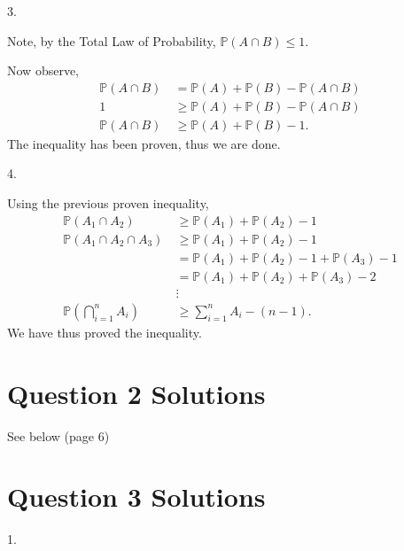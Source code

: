 \documentclass{article}
\begin{document}
3.

Note, by the Total Law of Probability, $\mathbb{P}(A\cap B) \leq 1$.

Now observe,
\begin{align*}
    \mathbb{P}(A\cap B) & = \mathbb{P}(A) +\mathbb{P}(B) - \mathbb{P}(A\cap B)\\    
    1 &\geq \mathbb{P}(A) +\mathbb{P}(B) - \mathbb{P}(A\cap B)\\
    \mathbb{P}(A\cap B)\ &\geq \mathbb{P}(A) +\mathbb{P}(B) - 1\mbox{.}
\end{align*}
\hspace*{6mm} The inequality has been proven, thus we are done.

4.

Using the previous proven inequality,
\begin{align*}
    \mathbb{P}(A_1\cap A_2)\ &\geq \mathbb{P}(A_1) + \mathbb{P}(A_2) - 1\\
    \mathbb{P}(A_1\cap A_2\cap A_3)\ &\geq \mathbb{P}(A_1) + \mathbb{P}(A_2) - 1\\
    &= \mathbb{P}(A_1) +\mathbb{P}(A_2) - 1 +  \mathbb{P}(A_3) - 1\\
    &= \mathbb{P}(A_1) +\mathbb{P}(A_2) +  \mathbb{P}(A_3) - 2\\
    &\vdots\\
    \mathbb{P}(\bigcap_{i = 1}^n A_i)\ &\geq \sum_{i = 1}^{n} A_i - (n-1)\mbox{.}
\end{align*}
\hspace*{6mm} We have thus proved the inequality. 

\section*{Question 2 Solutions} %
See below (page 6)
\pagebreak
\section*{Question 3 Solutions} %
1.
\end{document}
